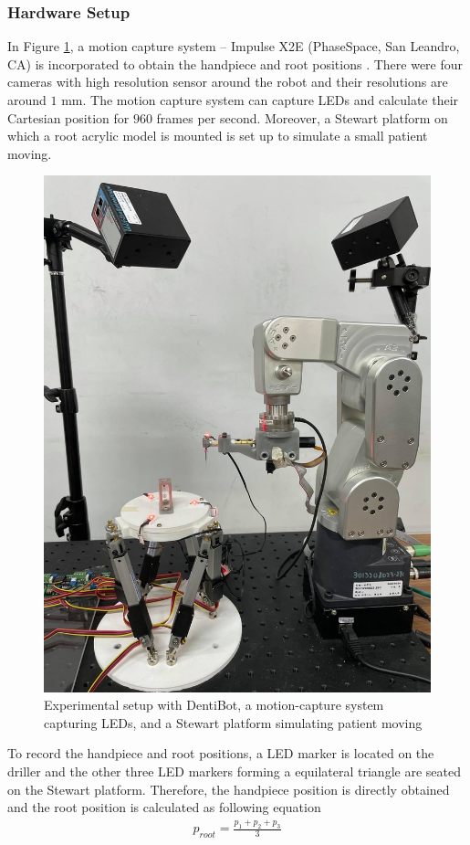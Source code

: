 \subsubsection{Hardware Setup}
\vspace{-5mm}
\hspace*{6mm}In Figure \ref{fig:system}, a motion capture system -- Impulse X2E (PhaseSpace, San Leandro, CA) is incorporated to obtain the handpiece and root positions . There were four cameras with high resolution sensor around the robot and their resolutions are around $1$ mm. The motion capture system can capture LEDs and calculate their Cartesian position for $960$ frames per second. Moreover, a Stewart platform on which a root acrylic model is mounted is set up to simulate a small patient moving. 
\begin{figure}[htbp]
\begin{center}
\includegraphics[width=0.6\linewidth]{Images/System.jpg}
\caption{Experimental setup with DentiBot, a motion-capture system capturing LEDs, and a Stewart platform simulating patient moving}
\label{fig:system}
\end{center}
\end{figure}
\par
To record the handpiece and root positions, a LED marker is located on the driller and the other three LED markers forming a equilateral triangle are seated on the Stewart platform. Therefore, the handpiece position is directly obtained and the root position is calculated as following equation
\begin{equation*}
\begin{split}
p_{root} = \frac{p_{1} + p_{2} + p_{3}}{3}
\end{split}
\end{equation*}
